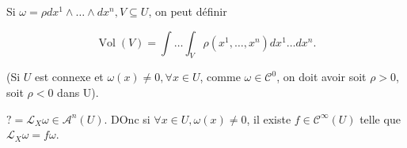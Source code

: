 \documentclass[french]{article}
\theoremstyle{definition}
\newcommand{\lesss}{<}
\newcommand{\less}{\lesss}
\newcommand{\biggg}{>}
\newcommand{\bg}{\biggg}
\begin{document}
Si \(\omega = \rho d x^{1}\wedge \dots \wedge d x^{n}, V \subseteq U\), on peut définir

\[\operatorname{Vol}(V) = \int \dots \int_{V} \rho(x ^{1}, \dots, x ^{n})d x^{1} \dots d x^{n}.\]

(Si \(U\) est connexe et \(\omega(x)\neq 0, \forall x \in U\), comme \(\omega \in \mathcal{C}^0\), on doit avoir soit \(\rho \bg 0\), soit \(\rho \less 0\) dans U).

\(? = \mathcal{L}_X \omega \in \mathscr{A}^{n}(U)\). DOnc si \(\forall x \in U, \omega(x)\neq 0\), il existe \(f \in \mathcal{C}^{\infty}(U)\) telle que \(\mathcal{L}_X \omega = f \omega\).

\end{document}
